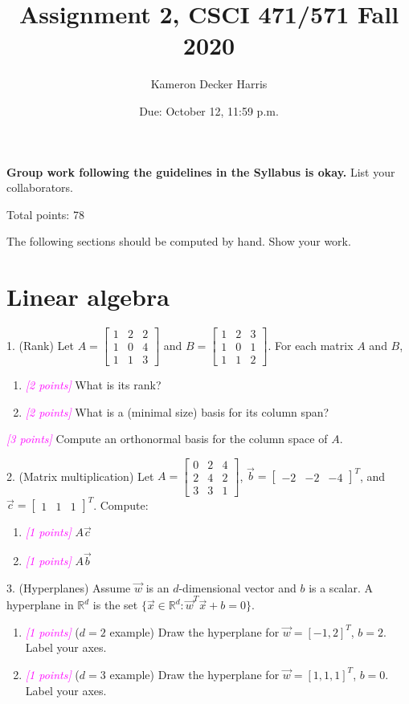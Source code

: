 \documentclass{article}
\title{Assignment 2, CSCI 471/571 Fall 2020}
\date{Due: October 12, 11:59 p.m.}
\author{Kameron Decker Harris}
\newcommand{\R}{\mathbb{R}} %
\newcommand{\points}[1]{\small\textcolor{magenta}{\emph{[#1 points]}} \normalsize}
\begin{document}
\maketitle

{\bf Group work following the guidelines in the Syllabus is okay.}
List your collaborators.

Total points: 78

\vspace{1em}
The following sections should be computed by hand. Show your work.
\section*{Linear algebra}
1. (Rank)
Let 
$A = \begin{bmatrix} 1 & 2 & 2 \\ 1 & 0 & 4 \\ 1 & 1 & 3 \end{bmatrix}$ and
$B = \begin{bmatrix} 1 & 2 & 3 \\ 1 & 0 & 1 \\ 1 & 1 & 2 \end{bmatrix}$.
For each matrix $A$ and $B$,
\begin{enumerate} 
\item \points{2} What is its rank? 
\item \points{2} What is a (minimal size) basis for its column span?
\end{enumerate}
\points{3} Compute an orthonormal basis for the column space of $A$.


2. (Matrix multiplication) 
Let 
$A = \begin{bmatrix} 0 & 2 & 4 \\ 2 & 4 & 2 \\ 3 & 3 & 1 \end{bmatrix}$, 
$\vec{b} = \begin{bmatrix} -2 & -2 & -4 \end{bmatrix}^T$, and 
$\vec{c} = \begin{bmatrix} 1 & 1 & 1 \end{bmatrix}^T$.
Compute:
\begin{enumerate}
\item \points{1} $A \vec{c}$
\item \points{1} $A \vec{b}$
\end{enumerate}

3. (Hyperplanes) Assume $\vec w$ is an $d$-dimensional vector and $b$ is a scalar.
A hyperplane in $\R^d$ is the set 
$\{\vec x \in \R^d: \vec w^T \vec x + b = 0\}$.
\begin{enumerate}
\item \points{1} ($d=2$ example) Draw the hyperplane for $\vec w=[-1,2]^T$, $b=2$. Label your axes.
\item \points{1} ($d=3$ example) Draw the hyperplane for $\vec w=[1,1,1]^T$, $b=0$. Label your axes.
\end{enumerate}
\end{document}
